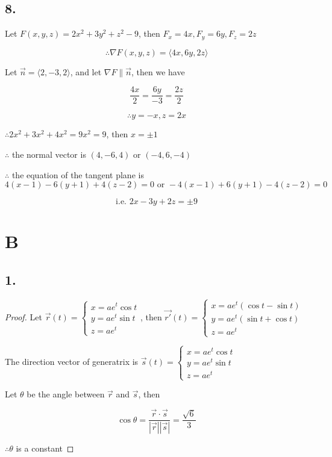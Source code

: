\documentclass{article}
\begin{document}
  \subsection*{8. }

  Let $F(x, y, z) = 2x^2+3y^2+z^2-9$, then $F_x = 4x, F_y = 6y, F_z = 2z$

  $$\therefore \nabla F(x, y, z) = \langle 4x, 6y, 2z \rangle$$

  Let $\overrightarrow n = \langle 2, -3, 2 \rangle$, and let $\nabla F \parallel \overrightarrow n$, then we have

  $$\frac{4x}{2} = \frac{6y}{-3} = \frac{2z}{2}$$

  $$\therefore y = -x, z = 2x$$

  $\therefore 2x^2 + 3x^2+4x^2 = 9x^2 = 9$, then $x = \pm 1$

  $\therefore$ the normal vector is $(4, -6, 4)$ or $(-4, 6, -4)$

  $\therefore$ the equation of the tangent plane is $$4(x-1)-6(y+1)+4(z-2) = 0 \textrm{ or } -4(x-1)+6(y+1)-4(z-2) = 0$$

  $$\textrm{i.e. } 2x-3y+2z=\pm 9$$

  \section*{B}

  \subsection*{1. }

  \begin{proof}
    Let $\overrightarrow{r} (t) = \left\{ \begin{array}{ll} x = ae^t \cos t \\ y = ae^t \sin t \\ z = ae^t \end{array}\right.$, then
    $\overrightarrow{r'}(t) = \left\{ \begin{array}{ll} x = ae^t(\cos t - \sin t) \\ y = ae^t(\sin t + \cos t) \\ z = ae^t\end{array} \right.$

    The direction vector of generatrix is $\overrightarrow{s}(t) = \left\{ \begin{array}{ll} x = ae^{t} \cos t \\ y = ae^t \sin t \\ z = ae^t \end{array} \right.$

    Let $\theta$ be the angle between $\overrightarrow r$ and $\overrightarrow s$, then

    $$\cos \theta = \frac{\overrightarrow r \cdot \overrightarrow s}{|\overrightarrow r| |\overrightarrow s|} = \frac{\sqrt 6}{3}$$

    $\therefore \theta$ is a constant
      
  \end{proof}
\end{document}
